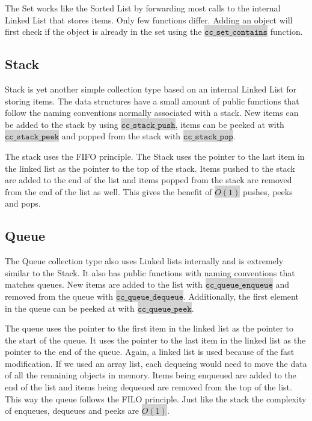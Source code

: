 \documentclass[table]{ituthesis}
\newcommand{\highlight}[1]{\colorbox{lightGray}{$\displaystyle \texttt{#1}$}}
\begin{document}
	The Set works like the Sorted List by forwarding most calls to the internal Linked List that stores items. Only few functions differ. Adding an object will first check if the object is already in the set using the \highlight{cc\_set\_contains} function. 
	
	\subsection{Stack}
	
	Stack is yet another simple collection type based on an internal Linked List for storing items. The data structures have a small amount of public functions that follow the naming conventions normally associated with a stack. New items can be added to the stack by using \highlight{cc\_stack\_push}, items can be peeked at with \highlight{cc\_stack\_peek} and popped from the stack with \highlight{cc\_stack\_pop}.

	The stack uses the FIFO principle. The Stack uses the pointer to the last item in the linked list as the pointer to the top of the stack. Items pushed to the stack are added to the end of the list and items popped from the stack are removed from the end of the list as well. This gives the benefit of \highlight{$O(1)$} pushes, peeks and pops.
	
	\subsection{Queue}
	
	The Queue collection type also uses Linked lists internally and is extremely similar to the Stack. It also has public functions with naming conventions that matches queues. New items are added to the list with \highlight{cc\_queue\_enqueue} and removed from the queue with \highlight{cc\_queue\_dequeue}. Additionally, the first element in the queue can be peeked at with \highlight{cc\_queue\_peek}.

	The queue uses the pointer to the first item in the linked list as the pointer to the start of the queue. It uses the pointer to the last item in the linked list as the pointer to the end of the queue. Again, a linked list is used because of the fast modification. If we used an array list, each dequeing would need to move the data of all the remaining objects in memory. Items being enqueued are added to the end of the list and items being dequeued are removed from the top of the list. This way the queue follows the FILO principle. Just like the stack the complexity of enqueues, dequeues and peeks are \highlight{$O(1)$}.
	
\end{document}
